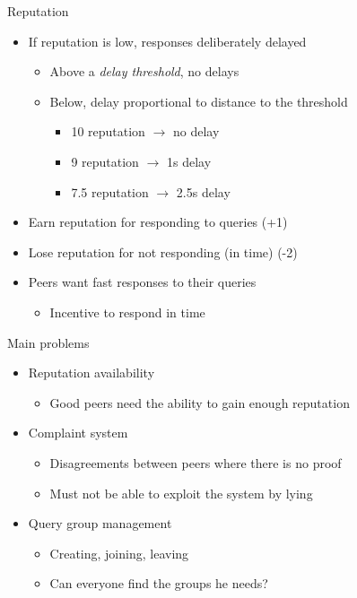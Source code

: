 \documentclass[presentation,english,usenames,dvipsnames]{beamer}
\begin{document}
\begin{frame}{Reputation}
  \begin{itemize}
    \item If reputation is low, responses deliberately delayed
    \begin{itemize}
      \item Above a \emph{delay threshold}, no delays
      \item Below, delay proportional to distance to the threshold
      \begin{itemize}
        \item 10 reputation $\rightarrow$ no delay
        \item 9 reputation $\rightarrow$ 1s delay
        \item 7.5 reputation $\rightarrow$ 2.5s delay
      \end{itemize}
    \end{itemize}

    \pause

    \item Earn reputation for responding to queries (+1)
    \item Lose reputation for not responding (in time) (-2)

    \pause

    \item Peers want fast responses to their queries
    \begin{itemize}
      \item Incentive to respond in time
    \end{itemize}
  \end{itemize}
\end{frame}

\begin{frame}{Main problems}
  \begin{itemize}
    \item<alert@2> Reputation availability
    \begin{itemize}
      \item Good peers need the ability to gain enough reputation
    \end{itemize}
    \item Complaint system
    \begin{itemize}
      \item Disagreements between peers where there is no proof
      \item Must not be able to exploit the system by lying
    \end{itemize}
    \item Query group management
    \begin{itemize}
      \item Creating, joining, leaving
      \item Can everyone find the groups he needs?
    \end{itemize}
  \end{itemize}
\end{frame}
\end{document}
